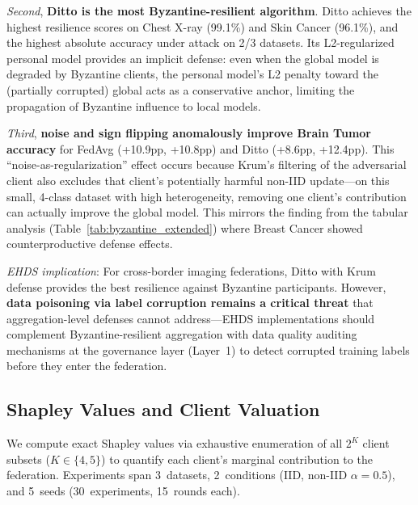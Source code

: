\documentclass[conference,a4paper]{IEEEtran}
\begin{document}
\textit{Second}, \textbf{Ditto is the most Byzantine-resilient algorithm}. Ditto achieves the highest resilience scores on Chest X-ray (99.1\%) and Skin Cancer (96.1\%), and the highest absolute accuracy under attack on 2/3 datasets. Its L2-regularized personal model provides an implicit defense: even when the global model is degraded by Byzantine clients, the personal model's L2 penalty toward the (partially corrupted) global acts as a conservative anchor, limiting the propagation of Byzantine influence to local models.

\textit{Third}, \textbf{noise and sign flipping anomalously improve Brain Tumor accuracy} for FedAvg (+10.9pp, +10.8pp) and Ditto (+8.6pp, +12.4pp). This ``noise-as-regularization'' effect occurs because Krum's filtering of the adversarial client also excludes that client's potentially harmful non-IID update---on this small, 4-class dataset with high heterogeneity, removing one client's contribution can actually improve the global model. This mirrors the finding from the tabular analysis (Table~\ref{tab:byzantine_extended}) where Breast Cancer showed counterproductive defense effects.

\textit{EHDS implication}: For cross-border imaging federations, Ditto with Krum defense provides the best resilience against Byzantine participants. However, \textbf{data poisoning via label corruption remains a critical threat} that aggregation-level defenses cannot address---EHDS implementations should complement Byzantine-resilient aggregation with data quality auditing mechanisms at the governance layer (Layer~1) to detect corrupted training labels before they enter the federation.

\subsection{Shapley Values and Client Valuation}
\label{sec:shapley_values}

We compute exact Shapley values via exhaustive enumeration of all $2^K$ client subsets ($K \in \{4, 5\}$) to quantify each client's marginal contribution to the federation. Experiments span 3~datasets, 2~conditions (IID, non-IID $\alpha{=}0.5$), and 5~seeds (30~experiments, 15~rounds each).
\end{document}
